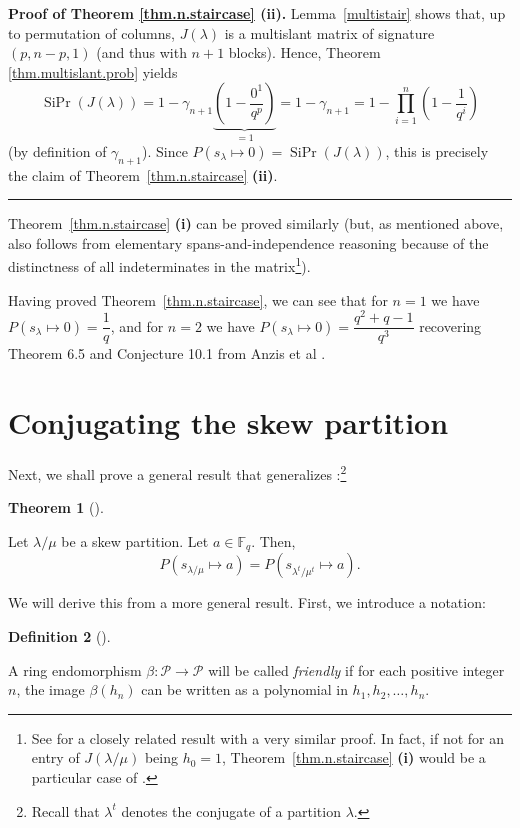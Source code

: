 \documentclass[numbers=enddot,12pt,final,onecolumn,notitlepage]{scrartcl}%
\theoremstyle{definition}
\newtheorem{theo}{Theorem}[section]
\newenvironment{theorem}[1][]
{\begin{theo}[#1]\begin{leftbar}}
{\end{leftbar}\end{theo}}
\newtheorem{defi}[theo]{Definition}
\newenvironment{definition}[1][]
{\begin{defi}[#1]\begin{leftbar}}
{\end{leftbar}\end{defi}}
\newenvironment{proof}[1][Proof]{\noindent\textbf{#1.} }{\ \rule{0.5em}{0.5em}}
\let\prodnonlimits\prod
\renewcommand{\prod}{\prodnonlimits\limits}
\newcommand{\tup}[1]{\left( #1 \right)}
\theoremstyle{plainsl}
\begin{document}
\begin{proof}[Proof of Theorem \ref{thm.n.staircase} \textbf{(ii)}]
Lemma~\ref{multistair} shows that, up to permutation of columns,
$J(\lambda)$ is a multislant matrix of signature $(p, n-p, 1)$
(and thus with $n+1$ blocks).
Hence, Theorem \ref{thm.multislant.prob} yields
\[
\operatorname*{SiPr}\tup{J\tup{\lambda}}
= 1 - \gamma_{n+1} \underbrace{\tup{1 - \dfrac{0^1}{q^p}}}_{= 1}
= 1 - \gamma_{n+1}
= 1 - \prod_{i=1}^{n} \left(  1-\dfrac{1}{q^{i}}\right)
\]
(by definition of $\gamma_{n+1}$).
Since $P(s_{\lambda} \longmapsto 0) = \operatorname*{SiPr}\tup{J\tup{\lambda}}$,
this is precisely the claim of Theorem~\ref{thm.n.staircase} \textbf{(ii)}.
\end{proof}

Theorem~\ref{thm.n.staircase} \textbf{(i)} can be proved similarly
(but, as mentioned above, also follows from elementary
spans-and-independence reasoning because of the distinctness of
all indeterminates in the matrix\footnote{See
\cite[Theorem 1]{Haglund} for a closely related result with a
very similar proof. In fact, if not for an entry of $J\tup{\lambda/\mu}$
being $h_0 = 1$, Theorem~\ref{thm.n.staircase} \textbf{(i)} would be
a particular case of \cite[Theorem 1]{Haglund}.}).

Having proved Theorem~\ref{thm.n.staircase}, we can see that for $n=1$
we have
$P(s_{\lambda} \longmapsto 0) = \dfrac{1}{q}$, and for $n=2$ we have
$P(s_{\lambda} \longmapsto 0) = \dfrac{q^2+q-1}{q^3}$
recovering Theorem 6.5 and Conjecture 10.1 from Anzis et al \cite{Anzis18}.


\section{Conjugating the skew partition}

Next, we shall prove a general result that generalizes \cite[Corollary
3.3]{Anzis18}:\footnote{Recall that $\lambda^{t}$ denotes the conjugate of a
partition $\lambda$.}

\begin{theorem}
\label{thm.transpose}Let $\lambda/\mu$ be a skew partition. Let $a\in
\mathbb{F}_{q}$. Then,
\[
P\left(  s_{\lambda/\mu}\mapsto a\right)  =P\left(  s_{\lambda^{t}/\mu^{t}%
}\mapsto a\right)  .
\]

\end{theorem}

We will derive this from a more general result. First, we introduce a notation:

\begin{definition}
A ring endomorphism $\beta:\mathcal{P}\rightarrow\mathcal{P}$ will be called
\emph{friendly} if for each positive integer $n$, the image $\beta\left(
h_{n}\right)  $ can be written as a polynomial in $h_{1},h_{2},\ldots,h_{n}$.
\end{definition}
\end{document}
